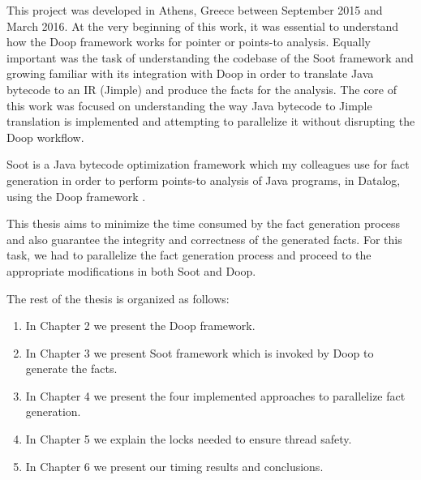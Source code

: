 \documentclass{dithesis}
\begin{document}
\tableofcontents
\listoffigures
\listoftables



\begin{thesisprologue}[Preface]
    This project was developed in Athens, Greece between September 2015 and March 2016. At the very beginning of this work, it was essential to understand how the Doop framework works for pointer or points-to analysis. Equally important was the task of understanding the codebase of the Soot framework and growing familiar with its integration with Doop in order to translate Java bytecode to an IR (Jimple) and produce the facts for the analysis. The core of this work was focused on understanding the way Java bytecode to Jimple translation is implemented and attempting to parallelize it without disrupting the Doop workflow.
\end{thesisprologue}

	Soot \cite{Sable: Soot} is a Java bytecode optimization framework which my colleagues use for fact generation in order to perform points-to analysis of Java programs, in Datalog, using the Doop framework \cite{Doop: Framework for Java Pointer Analysis}. 

	This thesis aims to minimize the time consumed by the fact generation process and also guarantee the integrity and correctness of the generated facts. For this task, we had to parallelize the fact generation process and proceed to the appropriate modifications in both Soot and Doop.

	The rest of the thesis is organized as follows:
	\begin{enumerate}
		\item In Chapter 2 we present the Doop framework.
		\item In Chapter 3 we present Soot framework which is invoked by Doop to generate the facts.
		\item In Chapter 4 we present the four implemented approaches to parallelize fact generation.
		\item In Chapter 5 we explain the locks needed to ensure thread safety.
		\item In Chapter 6 we present our timing results and conclusions.
	\end{enumerate}
\end{document}
